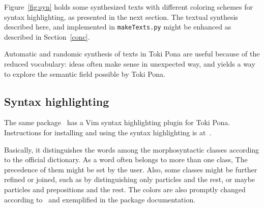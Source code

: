 \documentclass{article}
\newcommand{\tttt}[1]{\texttt{#1}}
\begin{document}
Figure~\ref{fig:syn} holds some synthesized texts
with different coloring schemes for syntax highlighting,
as presented in the next section.
The textual synthesis described here,
and implemented in \tttt{makeTexts.py}
might be enhanced as described in Section~\ref{conc}.

Automatic and randomic synthesis of texts in Toki Pona are
useful because of the reduced vocabulary: ideas often make
sense in unexpected way, and yields a way to 
explore the semantic field possible by Toki Pona.

\subsection{Syntax highlighting}\label{shigh}
The same package~\cite{tokipona}
has a Vim syntax highlighting plugin
for Toki Pona.
Instructions for installing and using
the syntax highlighting is at~\cite{tokipona}.

Basically, it distinguishes the words among the morphosyntactic
classes according to the official dictionary.
As a word often belongs to more than one class,
The precedence of them might be set by the user.
Also, some classes might be further refined or joined,
such as by distinguishing only particles and the rest,
or maybe particles and prepositions and the rest.
The colors are also promptly changed according to~\cite{vimArt}
and exemplified in the package documentation.
\end{document}
